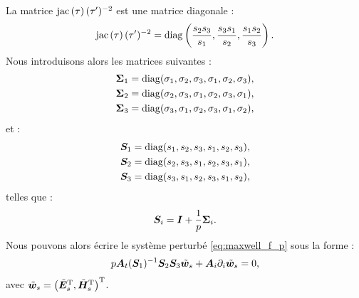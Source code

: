 La matrice $\mathrm{jac}\left(\tau\right) (\tau')^{-2}$ est une matrice diagonale :
\begin{align}
	\mathrm{jac}\left(\tau\right) (\tau')^{-2} = 
	\mathrm{diag}\left(
		\frac{s_2 s_3}{s_1} ,
		\frac{s_3 s_1}{s_2} ,
		\frac{s_1 s_2}{s_3} 
	\right) .
\end{align}
Nous introduisons alors les matrices suivantes :
\begin{subequations}
	\begin{align}
		\bm{\Sigma}_1 = \mathrm{diag} (
			\sigma_1, \sigma_2, \sigma_3,
			\sigma_1, \sigma_2, \sigma_3
		) , \\
		\bm{\Sigma}_2 = \mathrm{diag} (
			\sigma_2, \sigma_3, \sigma_1,
			\sigma_2, \sigma_3, \sigma_1
		) , \\
		\bm{\Sigma}_3 = \mathrm{diag} (
			\sigma_3, \sigma_1, \sigma_2,
			\sigma_3, \sigma_1, \sigma_2
		) ,
	\end{align}
\end{subequations}
et :
\begin{subequations}
	\begin{align}
		\bm{S}_1 = \mathrm{diag} (
			s_1, s_2, s_3,
			s_1, s_2, s_3
		) , \\
		\bm{S}_2 = \mathrm{diag} (
			s_2, s_3, s_1,
			s_2, s_3, s_1
		) , \\
		\bm{S}_3 = \mathrm{diag} (
			s_3, s_1, s_2,
			s_3, s_1, s_2
		) ,
	\end{align}
\end{subequations}
telles que :
\begin{align}
	\bm{S}_i = \bm{I} + \frac{1}{p} \bm{\Sigma}_i .
\end{align}
Nous pouvons alors écrire le système perturbé \eqref{eq:maxwell_f_p}
sous la forme :
\begin{align}
	p \bm{A}_{t} (\bm{S}_1)^{-1}
	\bm{S}_2 \bm{S}_3 \tilde{\bm{w}}_s
	+ {\bm{A}_{i}\partial_{i}} \tilde{\bm{w}}_s = 0
	\label{eq:maxwell_f_p_w} ,
\end{align}
avec $\tilde{\bm{w}}_s = \left( \tilde{\bm{E}}_s^{\mathrm{T}}, \tilde{\bm{H}}_s^{\mathrm{T}}\right)^{\mathrm{T}}$.


